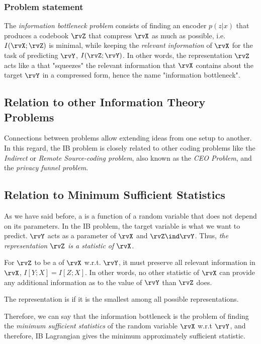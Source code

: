 \subsubsection{Problem statement}
The \emph{information bottleneck problem} consists of finding an encoder $p(z|x)$ that produces a codebook  $\rvZ$ that compress $\rvX$ as much as possible, i.e.\ $I(\rvX ; \rvZ)$ is minimal, while keeping the \emph{relevant information} of $\rvX$ for the task of predicting $\rvY$, $I(\rvZ;\rvY)$. In other words, the representation $\rvZ$ acts like a  that "squeezes" the relevant information that $\rvX$ contains about the target $\rvY$ in a compressed form, hence the name "information bottleneck".
\subsection{Relation to other Information Theory Problems}
Connections between problems allow extending ideas from one setup to another. In this regard, the IB problem is closely related to other coding problems like the \emph{Indirect} or \emph{Remote Source-coding problem}, also known as the \emph{CEO Problem}, and the \emph{privacy funnel problem}\cite{zaidi:2020}.
\subsection{Relation to Minimum Sufficient Statistics}
As we have said before,  a  is a function of a random variable that does not depend on its parameters. In the IB problem, the target variable is what we want to predict. $\rvY$ acts as a parameter of $\rvX$ and  $\rvZ \ind \rvY$. Thus, \emph{the representation $\rvZ$ is a statistic of $\rvX$}.

For $\rvZ$ to be a  of $\rvX$ w.r.t. $\rvY$, it must preserve all relevant information in $\rvX$, $I[Y;X]=I[Z;X]$. In other words, no other statistic of $\rvX$ can provide any additional information as to the value of $\rvY$ than $\rvZ$ does.

The representation is  if it is the smallest among all possible representations.

Therefore, we can say that the information bottleneck is the problem of finding the \emph{minimum sufficient statistics} of the random variable $\rvX$ w.r.t $\rvY$, and therefore, IB Lagrangian gives the minimum approximately sufficient statistic.
